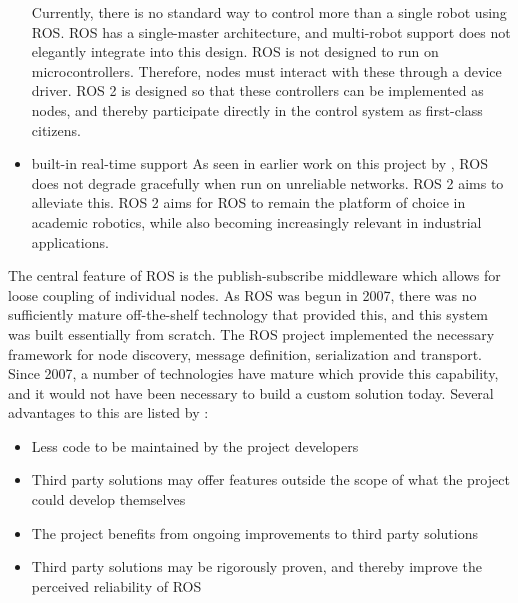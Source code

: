 \documentclass[\rootfolder/main.tex]{subfiles}
\begin{document}
\begin{itemize}
        Currently, there is no standard way to control more than a single robot using ROS.
        ROS has a single-master architecture, and multi-robot support does not elegantly integrate into this design.
        ROS is not designed to run on microcontrollers. Therefore, nodes must interact with these through a device driver.
        ROS 2 is designed so that these controllers can be implemented as nodes, and thereby participate directly in the control system as first-class citizens.
    \item{built-in real-time support}
        As seen in earlier work on this project by \cite{Waløen2017}, ROS does not degrade gracefully when run on unreliable networks.
        ROS 2 aims to alleviate this.
        ROS 2 aims for ROS to remain the platform of choice in academic robotics, while also becoming increasingly relevant in industrial applications.
\end{itemize}

The central feature of ROS is the publish-subscribe middleware which allows for loose coupling of individual nodes.
As ROS was begun in 2007, there was no sufficiently mature off-the-shelf technology that provided this, and this system was built essentially from scratch.
The ROS project implemented the necessary framework for node discovery, message definition, serialization and transport.
Since 2007, a number of technologies have mature which provide this capability, and it would not have been necessary to build a custom solution today.
Several advantages to this are listed by \cite{Gerkey2017}:

\begin{itemize}
    \item Less code to be maintained by the project developers
    \item Third party solutions may offer features outside the scope of what the project could develop themselves
    \item The project benefits from ongoing improvements to third party solutions
    \item Third party solutions may be rigorously proven, and thereby improve the perceived reliability of ROS
\end{itemize}

\end{document}
